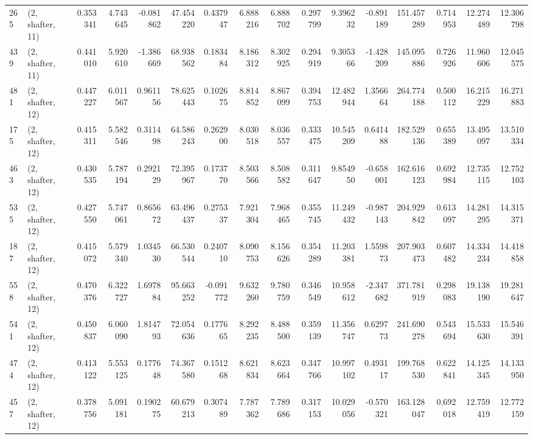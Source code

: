 \begin{tabular}{llrrrrrrrrrrrrrr}
265 &  (2, shafter, 11) &   0.353341 &   4.743645 &  -0.081862 &    47.454220 &   0.437947 &   6.888216 &   6.888702 &  0.297799 &   9.396232 &  -0.891189 &   151.457289 &  0.714953 &  12.274489 &  12.306798 \\
439 &  (2, shafter, 11) &   0.441010 &   5.920610 &  -1.386669 &    68.938562 &   0.183484 &   8.186312 &   8.302925 &  0.294919 &   9.305366 &  -1.428209 &   145.095886 &  0.726926 &  11.960606 &  12.045575 \\
481 &  (2, shafter, 12) &   0.447227 &   6.011567 &   0.961156 &    78.625443 &   0.102675 &   8.814852 &   8.867099 &  0.394753 &  12.482944 &   1.356664 &   264.774188 &  0.500112 &  16.215229 &  16.271883 \\
175 &  (2, shafter, 12) &   0.415311 &   5.582546 &   0.311498 &    64.586243 &   0.262900 &   8.030518 &   8.036557 &  0.333475 &  10.545209 &   0.641488 &   182.529136 &  0.655389 &  13.495097 &  13.510334 \\
463 &  (2, shafter, 12) &   0.430535 &   5.787194 &   0.292129 &    72.395967 &   0.173770 &   8.503566 &   8.508582 &  0.311647 &   9.854950 &  -0.658001 &   162.616123 &  0.692984 &  12.735115 &  12.752103 \\
535 &  (2, shafter, 12) &   0.427550 &   5.747061 &   0.865672 &    63.496437 &   0.275337 &   7.921304 &   7.968465 &  0.355745 &  11.249432 &  -0.987143 &   204.929842 &  0.613097 &  14.281295 &  14.315371 \\
187 &  (2, shafter, 12) &   0.415072 &   5.579340 &   1.034530 &    66.530544 &   0.240710 &   8.090753 &   8.156626 &  0.354289 &  11.203381 &   1.559873 &   207.903473 &  0.607482 &  14.334234 &  14.418858 \\
558 &  (2, shafter, 12) &   0.470376 &   6.322727 &   1.697884 &    95.663252 &  -0.091772 &   9.632260 &   9.780759 &  0.346549 &  10.958612 &  -2.347682 &   371.781919 &  0.298083 &  19.138190 &  19.281647 \\
541 &  (2, shafter, 12) &   0.450837 &   6.060090 &   1.814793 &    72.054636 &   0.177665 &   8.292235 &   8.488500 &  0.359139 &  11.356747 &   0.629773 &   241.690278 &  0.543694 &  15.533630 &  15.546391 \\
474 &  (2, shafter, 12) &   0.413122 &   5.553125 &   0.177648 &    74.367580 &   0.151268 &   8.621834 &   8.623664 &  0.347766 &  10.997102 &   0.493117 &   199.768530 &  0.622841 &  14.125345 &  14.133950 \\
457 &  (2, shafter, 12) &   0.378756 &   5.091181 &   0.190275 &    60.679213 &   0.307489 &   7.787362 &   7.789686 &  0.317153 &  10.029056 &  -0.570321 &   163.128047 &  0.692018 &  12.759419 &  12.772159 \\

\end{tabular}
